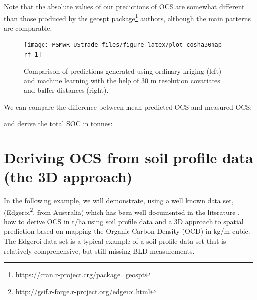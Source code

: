 \documentclass[graybox,natbib,nospthms,UStrade]{svmono}
\newenvironment{Shaded}{\begin{snugshade}}{\end{snugshade}}
\newcommand{\CommentTok}[1]{\textcolor[rgb]{0.37,0.37,0.37}{\textit{#1}}}
\newcommand{\DataTypeTok}[1]{\textcolor[rgb]{0.27,0.27,0.27}{#1}}
\newcommand{\DecValTok}[1]{\textcolor[rgb]{0.06,0.06,0.06}{#1}}
\newcommand{\FloatTok}[1]{\textcolor[rgb]{0.06,0.06,0.06}{#1}}
\newcommand{\KeywordTok}[1]{\textcolor[rgb]{0.27,0.27,0.27}{\textbf{#1}}}
\newcommand{\NormalTok}[1]{#1}
\newcommand{\OperatorTok}[1]{\textcolor[rgb]{0.43,0.43,0.43}{\textbf{#1}}}
\newcommand{\OtherTok}[1]{\textcolor[rgb]{0.37,0.37,0.37}{#1}}
\renewcommand{\href}[2]{#2 (\url{#1})}
\renewcommand{\href}[2]{#2\footnote{\url{#1}}}
\begin{document}
Note that the absolute values of our predictions of OCS are somewhat different than those produced by the \href{https://cran.r-project.org/package=geospt}{geospt package} authors, although the main patterns are comparable.

\begin{figure}[H]

{\centering \texttt{[image: PSMwR\_UStrade\_files/figure-latex/plot-cosha30map-rf-1]} 

}

\caption{Comparison of predictions generated using ordinary kriging (left) and machine learning with the help of 30 m resolution covariates and buffer distances (right).}\label{fig:plot-cosha30map-rf}
\end{figure}

We can compare the difference between mean predicted OCS and measured OCS:

\begin{Shaded}
\end{Shaded}

and derive the total SOC in tonnes:

\begin{Shaded}
\end{Shaded}

\hypertarget{ocs-3d-approach}{%
\section{Deriving OCS from soil profile data (the 3D approach)}\label{ocs-3d-approach}}

In the following example, we will demonstrate, using a well known data set, (\href{http://gsif.r-forge.r-project.org/edgeroi.html}{Edgeroi}, from Australia) which has been well documented in the literature \citep{Malone2009Geoderma}, how to derive OCS in t/ha using soil profile data and a 3D approach to spatial prediction based on mapping the Organic Carbon Density (OCD) in kg/m-cubic. The Edgeroi data set is a typical example of a soil profile data set that is relatively comprehensive, but still missing BLD measurements.
\end{document}
